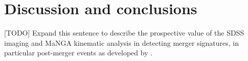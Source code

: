 \section{Discussion and conclusions}
\label{sec:discussion}


[TODO] Expand this sentence to describe the prospective value of the SDSS imaging and MaNGA kinematic analysis in detecting merger signatures, in particular post-merger events as developed by \cite{2019DDA....5020304N}.